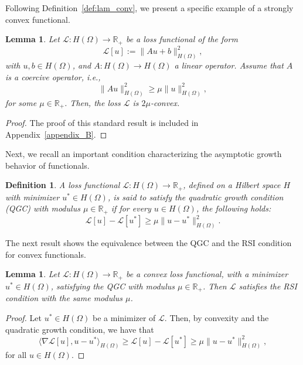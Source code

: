 \documentclass[pdflatex]{sn-jnl}%
\newtheorem{lemma}[theorem]{Lemma}
\newtheorem{definition}[theorem]{Definition}
\begin{document}
Following Definition~\ref{def:lam_conv}, we present a specific example of a strongly convex functional.
\begin{lemma}\label{lemm:lam_convlin}
    Let $\mathcal{L}:H(\Omega)\rightarrow \mathbb{R}_+$ be a loss functional of the form \begin{equation}
        \mathcal{L}[u] := \|Au+b\|_{H(\Omega)}^2,
    \end{equation}
    with $u,b\in H(\Omega)$, and $A: H(\Omega)\rightarrow H(\Omega)$ a linear operator. Assume that $A$ is a coercive operator, i.e., 
    \begin{equation}
        \|Au\|_{H(\Omega)}^2\geq \mu \|u\|_{H(\Omega)}^2,
    \end{equation}
    for some $\mu\in\mathbb{R}_+$. Then, the loss $\mathcal{L}$ is $2\mu$-convex.
\end{lemma}
\vspace{-1em}\begin{proof}
  The proof of this standard result is included in Appendix~\ref{appendix_B}.
\end{proof}
Next, we recall an important condition characterizing the asymptotic growth behavior of functionals.
\begin{definition}
    A loss functional $\mathcal{L}:H(\Omega)\rightarrow \mathbb{R}_+$, defined on a Hilbert space $H$ with minimizer $u^*\in H(\Omega)$, is said to satisfy the \emph{quadratic growth condition (QGC)} with modulus $\mu\in \mathbb{R}_+$ if for every $u\in H(\Omega)$, the following holds: 
    \begin{equation}
        \mathcal{L}[u]-\mathcal{L}[u^*]\geq\mu \|u-u^*\|_{H(\Omega)}^2.
    \end{equation}
\end{definition}
The next result shows the equivalence between the QGC and the RSI condition for convex functionals.
\begin{lemma}\label{lemma:QGC}
     Let $\mathcal{L}:H(\Omega)\rightarrow \mathbb{R}_+$ be a convex loss functional, with a minimizer $u^*\in H(\Omega)$, satisfying the QGC with modulus $\mu\in \mathbb{R}_+$. Then $\mathcal{L}$ satisfies the RSI condition with the same modulus $\mu$. 
\end{lemma}
\vspace{-1em}\begin{proof}
   Let \( u^* \in H(\Omega) \) be a minimizer of \( \mathcal{L} \). Then, by convexity and the quadratic growth condition, we have that 
    \begin{equation}
        \langle \nabla\mathcal{L}[u], u-u^*\rangle_{H(\Omega)}\geq \mathcal{L}[u]-\mathcal{L}[u^*]\geq \mu\|u-u^*\|_{H(\Omega)}^2,
    \end{equation}
    for all \( u \in H(\Omega) \).
\end{proof}
\end{document}
